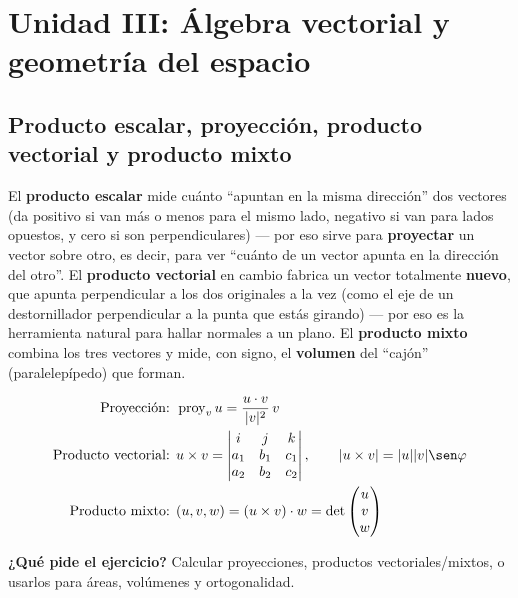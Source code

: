 \documentclass[11pt,a4paper]{article}
\newcommand{\qpide}[1]{\textbf{¿Qué pide el ejercicio?} #1\par}
\begin{document}
\section{Unidad III: Álgebra vectorial y geometría del espacio}

\subsection{Producto escalar, proyección, producto vectorial y producto mixto}

\begin{intuicion}
El \textbf{producto escalar} mide cuánto ``apuntan en la misma dirección'' dos vectores
(da positivo si van más o menos para el mismo lado, negativo si van para lados opuestos,
y cero si son perpendiculares) — por eso sirve para \textbf{proyectar} un vector sobre
otro, es decir, para ver ``cuánto de un vector apunta en la dirección del otro''. El
\textbf{producto vectorial} en cambio fabrica un vector totalmente \textbf{nuevo}, que
apunta perpendicular a los dos originales a la vez (como el eje de un destornillador
perpendicular a la punta que estás girando) — por eso es la herramienta natural para
hallar normales a un plano. El \textbf{producto mixto} combina los tres vectores y mide,
con signo, el \textbf{volumen} del ``cajón'' (paralelepípedo) que forman.
\end{intuicion}

\begin{teoria}[Fórmulas]
\begin{align*}
\text{Proyección: } &\operatorname{proy}_v u=\frac{u\cdot v}{|v|^2}\,v\\
\text{Producto vectorial: } &u\times v=\begin{vmatrix}i&j&k\\a_1&b_1&c_1\\a_2&b_2&c_2\end{vmatrix},
\qquad |u\times v|=|u||v|\sen\varphi\\
\text{Producto mixto: } &(u,v,w)=(u\times v)\cdot w=\det\begin{pmatrix}u\\v\\w\end{pmatrix}
\end{align*}
\end{teoria}

\qpide{Calcular proyecciones, productos vectoriales/mixtos, o usarlos para áreas,
volúmenes y ortogonalidad.}
\end{document}
